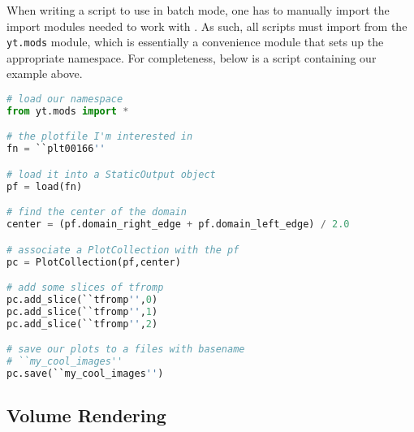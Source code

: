 When writing a script to use in batch mode, one has to manually import
the import modules needed to work with \yt.  As such, all scripts must
import from the {\tt yt.mods} module, which is essentially a
convenience module that sets up the appropriate \yt namespace.  
For completeness, below is a script containing our example above.
\begin{lstlisting}[language=Python]
# load our namespace
from yt.mods import *

# the plotfile I'm interested in
fn = ``plt00166''

# load it into a StaticOutput object
pf = load(fn)

# find the center of the domain
center = (pf.domain_right_edge + pf.domain_left_edge) / 2.0

# associate a PlotCollection with the pf
pc = PlotCollection(pf,center)

# add some slices of tfromp
pc.add_slice(``tfromp'',0)
pc.add_slice(``tfromp'',1)
pc.add_slice(``tfromp'',2)

# save our plots to a files with basename
# ``my_cool_images''
pc.save(``my_cool_images'')
\end{lstlisting}

\subsection{Volume Rendering}

